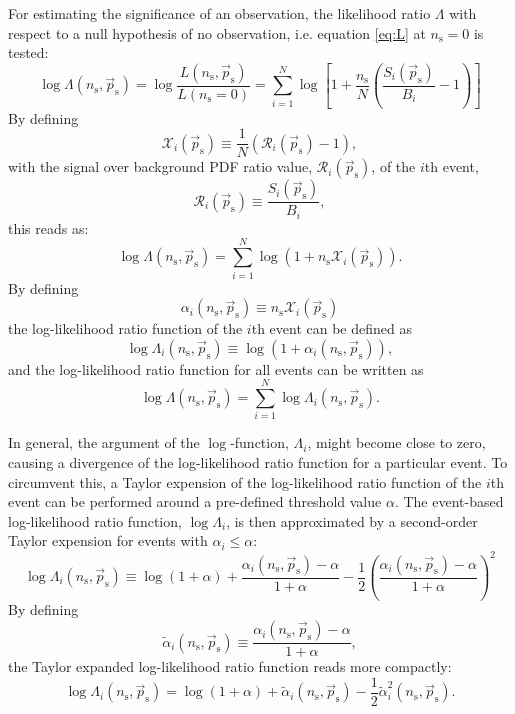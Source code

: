 \documentclass{article}
\newcommand{\ns}{n_{\mathrm{s}}}
\newcommand{\ps}{\vec{p}_{\mathrm{s}}}
\begin{document}
For estimating the significance of an observation, the likelihood ratio
$\Lambda$ with respect to a null hypothesis of no observation, i.e.
equation \ref{eq:L} at $\ns=0$ is tested:
\begin{equation}
 \log \Lambda(\ns,\ps) = \log \frac{L(\ns,\ps)}{L(\ns=0)} = \sum_{i=1}^{N} \log \left[ 1 + \frac{\ns}{N}\left( \frac{S_i(\ps)}{B_i} - 1 \right) \right]
\label{eq:logLambda}
\end{equation}
By defining
\begin{equation}
\mathcal{X}_i(\ps) \equiv \frac{1}{N}\left( \mathcal{R}_i(\ps) - 1 \right),
\label{eq:Xi}
\end{equation}
with the signal over background PDF ratio value, $\mathcal{R}_{i}(\ps)$, of the
$i$th event,
\begin{equation}
 \mathcal{R}_i(\ps) \equiv \frac{S_i(\ps)}{B_i},
\end{equation}
this reads as:
\begin{equation}
 \log \Lambda(\ns,\ps) = \sum_{i=1}^{N} \log (1 + \ns\mathcal{X}_i(\ps)).
 \label{eq:logLambdaOfX}
\end{equation}
By defining
\begin{equation}
 \alpha_i(\ns,\ps) \equiv \ns \mathcal{X}_i(\ps)
\end{equation}
the log-likelihood ratio function of the $i$th event can be defined as
\begin{equation}
 \log \Lambda_i(\ns,\ps) \equiv \log(1 + \alpha_i(\ns, \ps)),
 \label{eq:logLambdaiOfalphai}
\end{equation}
and the log-likelihood ratio function for all events can be written as
\begin{equation}
 \log \Lambda(\ns,\ps) = \sum_{i=1}^{N} \log \Lambda_i(\ns,\ps).
 \label{eq:logLambdaOflogLambdai}
\end{equation}

In general, the argument of the $\log$-function, $\Lambda_i$, might become close
to zero, causing a divergence of the log-likelihood ratio function for a particular event.
To circumvent this, a Taylor expension of the
log-likelihood ratio function of the $i$th event can be performed around a
pre-defined threshold value $\alpha$.
The event-based log-likelihood ratio function, $\log \Lambda_i$, is then
approximated by a second-order Taylor expension for events with $\alpha_i \leq \alpha$:
\begin{equation}
 \log\Lambda_i(\ns,\ps) \equiv \log(1 + \alpha) + \frac{\alpha_i(\ns,\ps) - \alpha}{1 + \alpha} - \frac{1}{2} \left(\frac{\alpha_i(\ns,\ps) - \alpha}{1 + \alpha}\right)^2
 \label{eq:logLambdaiTaylor}
\end{equation}
By defining
\begin{equation}
 \tilde{\alpha}_i(\ns,\ps) \equiv \frac{\alpha_i(\ns,\ps) - \alpha}{1 + \alpha},
\end{equation}
the Taylor expanded log-likelihood ratio function reads more compactly:
\begin{equation}
 \log\Lambda_i(\ns,\ps) = \log(1 + \alpha) + \tilde{\alpha}_i(\ns,\ps) - \frac{1}{2} \tilde{\alpha}_i^2(\ns,\ps).
 \label{eq:logLambdaiTaylorOfTildeAlpha}
\end{equation}
\end{document}
